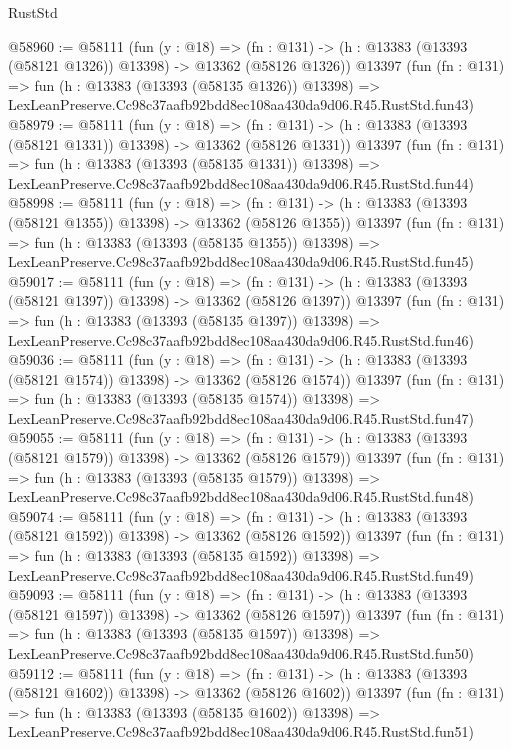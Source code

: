 \begin{lexlean}{RustStd}
\begin{coremodule}
@58960 := @58111
    (fun (y : @18) =>
    (fn : @131) -> (h : @13383 (@13393 (@58121 @1326)) @13398) -> @13362 (@58126 @1326))
    @13397
    (fun (fn : @131) =>
    fun (h : @13383 (@13393 (@58135 @1326)) @13398) =>
    LexLeanPreserve.Cc98c37aafb92bdd8ec108aa430da9d06.R45.RustStd.fun43)
@58979 := @58111
    (fun (y : @18) =>
    (fn : @131) -> (h : @13383 (@13393 (@58121 @1331)) @13398) -> @13362 (@58126 @1331))
    @13397
    (fun (fn : @131) =>
    fun (h : @13383 (@13393 (@58135 @1331)) @13398) =>
    LexLeanPreserve.Cc98c37aafb92bdd8ec108aa430da9d06.R45.RustStd.fun44)
@58998 := @58111
    (fun (y : @18) =>
    (fn : @131) -> (h : @13383 (@13393 (@58121 @1355)) @13398) -> @13362 (@58126 @1355))
    @13397
    (fun (fn : @131) =>
    fun (h : @13383 (@13393 (@58135 @1355)) @13398) =>
    LexLeanPreserve.Cc98c37aafb92bdd8ec108aa430da9d06.R45.RustStd.fun45)
@59017 := @58111
    (fun (y : @18) =>
    (fn : @131) -> (h : @13383 (@13393 (@58121 @1397)) @13398) -> @13362 (@58126 @1397))
    @13397
    (fun (fn : @131) =>
    fun (h : @13383 (@13393 (@58135 @1397)) @13398) =>
    LexLeanPreserve.Cc98c37aafb92bdd8ec108aa430da9d06.R45.RustStd.fun46)
@59036 := @58111
    (fun (y : @18) =>
    (fn : @131) -> (h : @13383 (@13393 (@58121 @1574)) @13398) -> @13362 (@58126 @1574))
    @13397
    (fun (fn : @131) =>
    fun (h : @13383 (@13393 (@58135 @1574)) @13398) =>
    LexLeanPreserve.Cc98c37aafb92bdd8ec108aa430da9d06.R45.RustStd.fun47)
@59055 := @58111
    (fun (y : @18) =>
    (fn : @131) -> (h : @13383 (@13393 (@58121 @1579)) @13398) -> @13362 (@58126 @1579))
    @13397
    (fun (fn : @131) =>
    fun (h : @13383 (@13393 (@58135 @1579)) @13398) =>
    LexLeanPreserve.Cc98c37aafb92bdd8ec108aa430da9d06.R45.RustStd.fun48)
@59074 := @58111
    (fun (y : @18) =>
    (fn : @131) -> (h : @13383 (@13393 (@58121 @1592)) @13398) -> @13362 (@58126 @1592))
    @13397
    (fun (fn : @131) =>
    fun (h : @13383 (@13393 (@58135 @1592)) @13398) =>
    LexLeanPreserve.Cc98c37aafb92bdd8ec108aa430da9d06.R45.RustStd.fun49)
@59093 := @58111
    (fun (y : @18) =>
    (fn : @131) -> (h : @13383 (@13393 (@58121 @1597)) @13398) -> @13362 (@58126 @1597))
    @13397
    (fun (fn : @131) =>
    fun (h : @13383 (@13393 (@58135 @1597)) @13398) =>
    LexLeanPreserve.Cc98c37aafb92bdd8ec108aa430da9d06.R45.RustStd.fun50)
@59112 := @58111
    (fun (y : @18) =>
    (fn : @131) -> (h : @13383 (@13393 (@58121 @1602)) @13398) -> @13362 (@58126 @1602))
    @13397
    (fun (fn : @131) =>
    fun (h : @13383 (@13393 (@58135 @1602)) @13398) =>
    LexLeanPreserve.Cc98c37aafb92bdd8ec108aa430da9d06.R45.RustStd.fun51)

\end{coremodule}
\end{lexlean}
